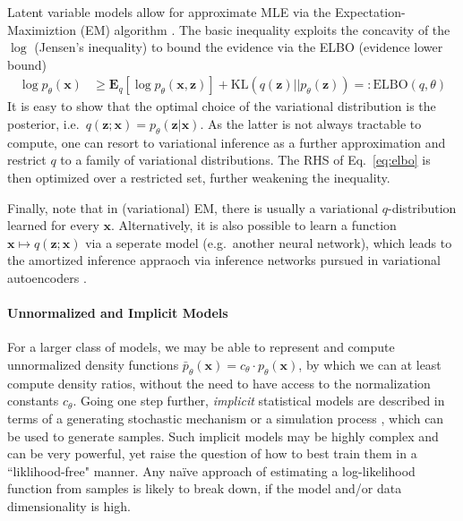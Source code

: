 \documentclass{article}
\newcommand{\E}{{\mathbf E}}
\newcommand{\x}{{\mathbf x}}
\newcommand{\z}{{\mathbf z}}
\begin{document}
Latent variable models allow for approximate MLE via the Expectation-Maximiztion (EM) algorithm \cite{dempster1977maximum}. The basic inequality exploits the concavity of the $\log$ (Jensen's inequality) to bound the evidence via the ELBO (evidence lower bound)
\begin{align}
\log p_\theta(\x) & \ge  \E_q\left[ \log p_\theta(\x,\z)\right] + \text{KL}(q(\z) || p_\theta(\z))  =: \text{ELBO}(q,\theta)
\label{eq:elbo}
\end{align}
It is easy to show that the optimal choice of the variational distribution is the posterior, i.e.~$q(\z;\x) = p_\theta(\z|\x)$. As the latter is not always tractable to compute, one can  resort to variational inference as a further approximation and restrict $q$ to a family of variational distributions. The RHS of Eq.~\eqref{eq:elbo} is then optimized over a restricted set, further weakening the inequality. 

Finally, note that in (variational) EM, there is usually  a variational $q$-distribution learned for every $\x$. Alternatively, it is also possible to learn a function $\x \mapsto q(\z;\x)$ via a seperate model (e.g.~another neural network), which leads to the amortized inference appraoch via inference networks pursued in variational autoencoders \cite{kingma2013auto,rezende2014stochastic}.

\paragraph{Unnormalized and Implicit Models} 
For a larger class of models, we may be able to represent and compute unnormalized density functions $\bar p_\theta(\x) = c_\theta \cdot p_\theta(\x)$, by which we can at least compute density ratios, without the need to have access to the normalization constants $c_\theta$. Going one step further, \textit{implicit} statistical models \cite{diggle1984monte} are described in  terms of a generating stochastic mechanism or a simulation process \cite{hartig2011statistical}, which can be used to generate samples. Such implicit models may be highly complex and can be very powerful, yet raise the question of how to best train them in a ``liklihood-free" manner. Any na\"ive approach of estimating a log-likelihood function from samples \cite{diggle1984monte} is likely to break down, if the model and/or data dimensionality is high. 
\end{document}
